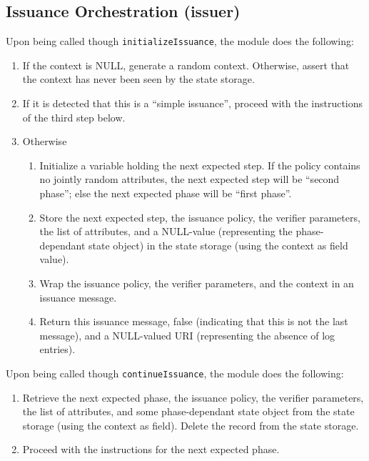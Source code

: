   \subsection{Issuance Orchestration (issuer)}
  Upon being called though \texttt{initializeIssuance}, the module does the following:
  \begin{enumerate}
    \item If the context is NULL, generate a random context. Otherwise, assert that the context has never been seen by the state storage.
    \item If it is detected that this is a ``simple issuance'', proceed with the instructions of the third step below.
    \item Otherwise
    \begin{enumerate}
      \item Initialize a variable holding the next expected step.
        If the policy contains no jointly random attributes, the next expected step will be ``second phase''; else the next expected phase will
        be ``first phase''.
      \item Store the next expected step, the issuance policy, the verifier parameters, the list of attributes, and a NULL-value
        (representing the phase-dependant state object) in the state storage (using the context as field value).
      \item Wrap the issuance policy, the verifier parameters, and the context
        in an issuance message.
      \item Return this issuance message, false (indicating that this is not the last message), and a NULL-valued URI (representing the absence of log entries).
    \end{enumerate}
  \end{enumerate}
  Upon being called though \texttt{continueIssuance}, the module does the following:
  \begin{enumerate}
  \item Retrieve the next expected phase, the issuance policy, the verifier parameters, the list of attributes,
    and some phase-dependant state object from the state storage (using the context as field).
    Delete the record from the state storage.
  \item Proceed with the instructions for the next expected phase.
  \end{enumerate}

